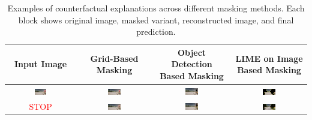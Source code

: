 \begin{samepage}

\begin{table}[h]
\centering
\renewcommand{\arraystretch}{1.2}
\caption[Counterfactuals for various masking methods]{Examples of counterfactual explanations across different masking methods. Each block shows original image, masked variant, reconstructed image, and final prediction.}
\label{tab:cf_masking_comparison}

\begin{tabular}{c|c|c|c}
\textbf{Input Image} & 
\makecell[c]{\textbf{Grid-Based} \\ \textbf{Masking}} & 
\makecell[c]{\textbf{Object Detection} \\ \textbf{Based Masking}} & 
\makecell[c]{\textbf{LIME on Image} \\ \textbf{Based Masking}} \\
\toprule

\includegraphics[width=0.18\textwidth]{img/appendix/original_town7_000980.png} &
\includegraphics[width=0.18\textwidth]{img/appendix/grid_masked_town7_000980.png} &
\includegraphics[width=0.18\textwidth]{img/appendix/object_masked_town7_000980.png} &
\includegraphics[width=0.18\textwidth]{img/appendix/LIME_on_Image_maksed_town7_000980.png} \\

\textcolor{red}{STOP} &
\includegraphics[width=0.18\textwidth]{img/appendix/grid_reconstructed_town7_000980.png} &
\includegraphics[width=0.18\textwidth]{img/appendix/object_reconstructed_town7_000980.png} &
\includegraphics[width=0.18\textwidth]{img/appendix/LIME_on_Image_reconstructed_town7_000980.png} \\


\end{tabular}
\end{table}
\end{samepage}
